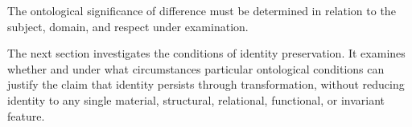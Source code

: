 The ontological significance of difference must be
determined in relation to the subject, domain, and
respect under examination.

The next section investigates the conditions of
identity preservation. It examines whether and under
what circumstances particular ontological conditions
can justify the claim that identity persists through
transformation, without reducing identity to any
single material, structural, relational, functional,
or invariant feature.

